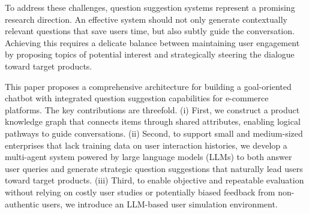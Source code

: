 \documentclass[conference]{IEEEtran}
\begin{document}
To address these challenges, question suggestion systems represent a promising research direction. An effective system should not only generate contextually relevant questions that save users time, but also subtly guide the conversation. Achieving this requires a delicate balance between maintaining user engagement by proposing topics of potential interest and strategically steering the dialogue toward target products.



This paper proposes a comprehensive architecture for building a goal-oriented chatbot with integrated question suggestion capabilities for e-commerce platforms. The key contributions are threefold. (i) First, we construct a product knowledge graph that connects items through shared attributes, enabling logical pathways to guide conversations. (ii) Second, to support small and medium-sized enterprises that lack training data on user interaction histories, we develop a multi-agent system powered by large language models (LLMs) to both answer user queries and generate strategic question suggestions that naturally lead users toward target products. (iii) Third, to enable objective and repeatable evaluation without relying on costly user studies or potentially biased feedback from non-authentic users, we introduce an LLM-based user simulation environment.


\end{document}
